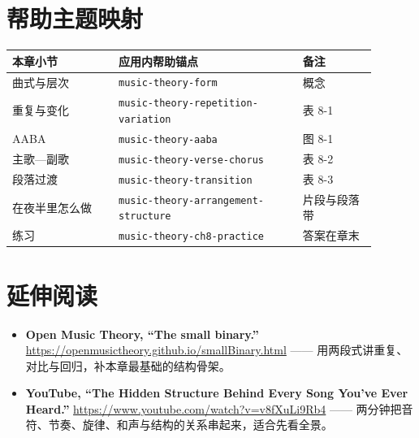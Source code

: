 \section{帮助主题映射}

\begin{center}
\small
\begin{tabular}{p{0.26\linewidth}p{0.45\linewidth}p{0.18\linewidth}}
\toprule
本章小节 & 应用内帮助锚点 & 备注 \\
\midrule
曲式与层次 & \texttt{music-theory-form} & 概念 \\
重复与变化 & \texttt{music-theory-repetition-variation} & 表 8-1 \\
AABA & \texttt{music-theory-aaba} & 图 8-1 \\
主歌—副歌 & \texttt{music-theory-verse-chorus} & 表 8-2 \\
段落过渡 & \texttt{music-theory-transition} & 表 8-3 \\
在夜半里怎么做 & \texttt{music-theory-arrangement-structure} & 片段与段落带 \\
练习 & \texttt{music-theory-ch8-practice} & 答案在章末 \\
\bottomrule
\end{tabular}
\end{center}

\section*{延伸阅读}
\begin{itemize}
  \item \textbf{Open Music Theory, “The small binary.”} \url{https://openmusictheory.github.io/smallBinary.html} —— 用两段式讲重复、对比与回归，补本章最基础的结构骨架。
  \item \textbf{YouTube, “The Hidden Structure Behind Every Song You've Ever Heard.”} \url{https://www.youtube.com/watch?v=v8fXuLi9Rb4} —— 两分钟把音符、节奏、旋律、和声与结构的关系串起来，适合先看全景。
\end{itemize}

